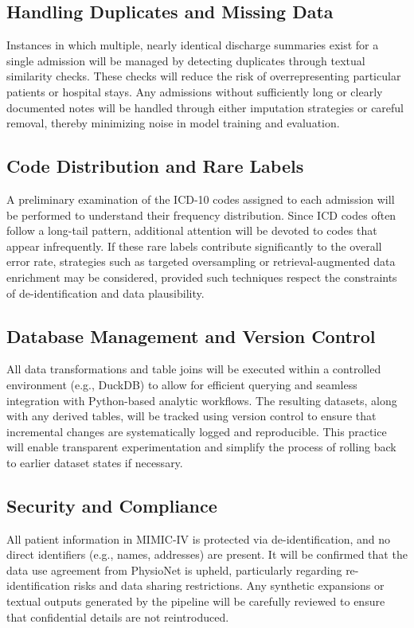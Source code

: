 \subsection{Handling Duplicates and Missing Data}
Instances in which multiple, nearly identical discharge summaries exist for a single admission will be managed by detecting duplicates through textual similarity checks. These checks will reduce the risk of overrepresenting particular patients or hospital stays. Any admissions without sufficiently long or clearly documented notes will be handled through either imputation strategies or careful removal, thereby minimizing noise in model training and evaluation.

\subsection{Code Distribution and Rare Labels}
A preliminary examination of the ICD-10 codes assigned to each admission will be performed to understand their frequency distribution. Since ICD codes often follow a long-tail pattern, additional attention will be devoted to codes that appear infrequently. If these rare labels contribute significantly to the overall error rate, strategies such as targeted oversampling or retrieval-augmented data enrichment may be considered, provided such techniques respect the constraints of de-identification and data plausibility.

\subsection{Database Management and Version Control}
All data transformations and table joins will be executed within a controlled environment (e.g., DuckDB) to allow for efficient querying and seamless integration with Python-based analytic workflows. The resulting datasets, along with any derived tables, will be tracked using version control to ensure that incremental changes are systematically logged and reproducible. This practice will enable transparent experimentation and simplify the process of rolling back to earlier dataset states if necessary.

\subsection{Security and Compliance}
All patient information in MIMIC-IV is protected via de-identification, and no direct identifiers (e.g., names, addresses) are present. It will be confirmed that the data use agreement from PhysioNet is upheld, particularly regarding re-identification risks and data sharing restrictions. Any synthetic expansions or textual outputs generated by the pipeline will be carefully reviewed to ensure that confidential details are not reintroduced.

